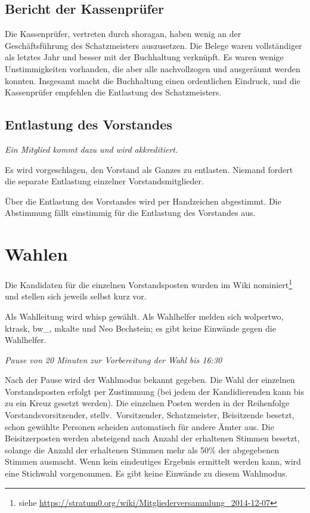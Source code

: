 \documentclass[a4paper,12pt]{scrartcl}
\begin{document}
\subsection*{Bericht der Kassenprüfer}
Die Kassenprüfer, vertreten durch shoragan, haben wenig an der Geschäftsführung
des Schatzmeisters auszusetzen. Die Belege waren vollständiger als letztes Jahr
und besser mit der Buchhaltung verknüpft. Es waren wenige Unstimmigkeiten
vorhanden, die aber alle nachvollzogen und ausgeräumt werden konnten. Insgesamt
macht die Buchhaltung einen ordentlichen Eindruck, und die Kassenprüfer
empfehlen die Entlastung des Schatzmeisters.


\subsection*{Entlastung des Vorstandes}
\emph{Ein Mitglied kommt dazu und wird akkreditiert.}

Es wird vorgeschlagen, den Vorstand als Ganzes zu entlasten. Niemand fordert die
separate Entlastung einzelner Vorstandsmitglieder.

Über die Entlastung des Vorstandes wird per Handzeichen abgestimmt. Die
Abstimmung fällt einstimmig für die Entlastung des Vorstandes aus.


\section{Wahlen}

Die Kandidaten für die einzelnen Vorstandsposten wurden im Wiki
nominiert\footnote{siehe
\url{https://stratum0.org/wiki/Mitgliederversammlung_2014-12-07}} und stellen
sich jeweils selbst kurz vor.

Als Wahlleitung wird whisp gewählt. Als Wahlhelfer melden sich wolpertwo,
ktrask, bw\_, mkalte und Neo Bechstein; es gibt keine Einwände gegen die
Wahlhelfer.

\emph{Pause von 20 Minuten zur Vorbereitung der Wahl bis 16:30}

Nach der Pause wird der Wahlmodus bekannt gegeben. Die Wahl der einzelnen
Vorstandsposten erfolgt per Zustimmung (bei jedem der Kandidierenden kann bis zu
ein Kreuz gesetzt werden). Die einzelnen Posten werden in der Reihenfolge
Vorstandsvorsitzender, stellv.~Vorsitzender, Schatzmeister, Beisitzende besetzt,
schon gewählte Personen scheiden automatisch für andere Ämter aus. Die
Beisitzerposten werden absteigend nach Anzahl der erhaltenen Stimmen besetzt,
solange die Anzahl der erhaltenen Stimmen mehr als 50\% der abgegebenen Stimmen
ausmacht. Wenn kein eindeutiges Ergebnis ermittelt werden kann, wird eine
Stichwahl vorgenommen. Es gibt keine Einwände zu diesem Wahlmodus.
\end{document}

